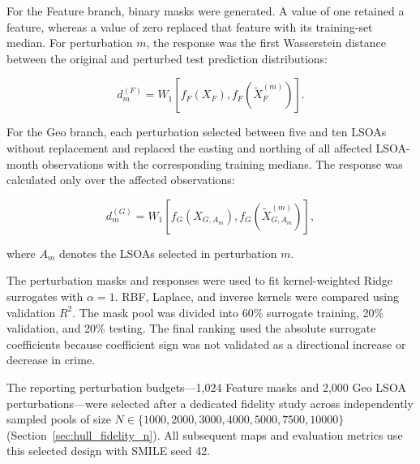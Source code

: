 For the Feature branch, binary masks were generated. A value of one retained a feature, whereas a value of zero replaced that feature with its training-set median. For perturbation $m$, the response was the first Wasserstein distance between the original and perturbed test prediction distributions:

\begin{equation}
d_m^{(F)}
=
W_1
\left[
f_F(X_F),
f_F\left(\widetilde{X}^{(m)}_F\right)
\right].
\label{eq:hull_feature_response}
\end{equation}

For the Geo branch, each perturbation selected between five and ten LSOAs without replacement and replaced the easting and northing of all affected LSOA-month observations with the corresponding training medians. The response was calculated only over the affected observations:

\begin{equation}
d_m^{(G)}
=
W_1
\left[
f_G(X_{G,A_m}),
f_G\left(\widetilde{X}^{(m)}_{G,A_m}\right)
\right],
\label{eq:hull_geo_response}
\end{equation}

where $A_m$ denotes the LSOAs selected in perturbation $m$.

The perturbation masks and responses were used to fit kernel-weighted Ridge surrogates with $\alpha=1$. RBF, Laplace, and inverse kernels were compared using validation $R^2$. The mask pool was divided into 60\% surrogate training, 20\% validation, and 20\% testing. The final ranking used the absolute surrogate coefficients because coefficient sign was not validated as a directional increase or decrease in crime.

The reporting perturbation budgets---1,024 Feature masks and 2,000 Geo LSOA perturbations---were selected after a dedicated fidelity study across independently sampled pools of size $N\in\{1000,2000,3000,4000,5000,7500,10000\}$ (Section~\ref{sec:hull_fidelity_n}). All subsequent maps and evaluation metrics use this selected design with SMILE seed 42.

